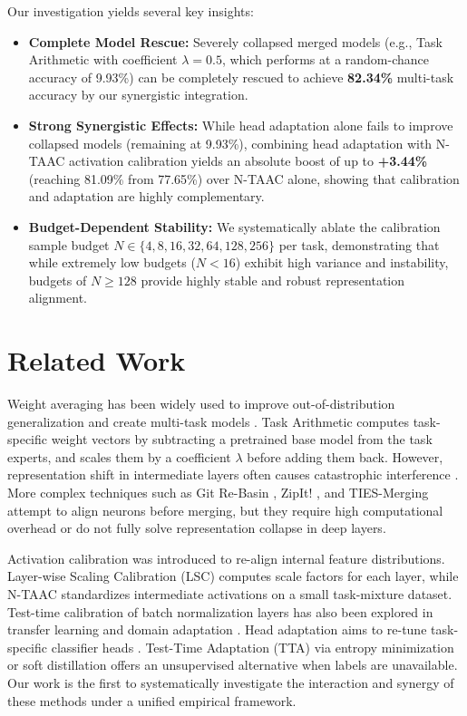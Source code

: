 \documentclass{article}
\theoremstyle{plain}
\theoremstyle{definition}
\theoremstyle{remark}
\begin{document}
Our investigation yields several key insights:
\begin{itemize}
    \item \textbf{Complete Model Rescue:} Severely collapsed merged models (e.g., Task Arithmetic with coefficient $\lambda = 0.5$, which performs at a random-chance accuracy of 9.93\%) can be completely rescued to achieve \textbf{82.34\%} multi-task accuracy by our synergistic integration.
    \item \textbf{Strong Synergistic Effects:} While head adaptation alone fails to improve collapsed models (remaining at 9.93\%), combining head adaptation with N-TAAC activation calibration yields an absolute boost of up to \textbf{+3.44\%} (reaching 81.09\% from 77.65\%) over N-TAAC alone, showing that calibration and adaptation are highly complementary.
    \item \textbf{Budget-Dependent Stability:} We systematically ablate the calibration sample budget $N \in \{4, 8, 16, 32, 64, 128, 256\}$ per task, demonstrating that while extremely low budgets ($N < 16$) exhibit high variance and instability, budgets of $N \ge 128$ provide highly stable and robust representation alignment.
\end{itemize}

\section{Related Work}
\label{sec:related_work}

Weight averaging has been widely used to improve out-of-distribution generalization \cite{cha2022domain, wortsman2022robust} and create multi-task models \cite{wortsman2022model, ilharco2022editing}. Task Arithmetic \cite{ilharco2022editing} computes task-specific weight vectors by subtracting a pretrained base model from the task experts, and scales them by a coefficient $\lambda$ before adding them back. However, representation shift in intermediate layers often causes catastrophic interference \cite{choshen2022fusing, jin2023dataless}. More complex techniques such as Git Re-Basin \cite{ainsworth2022git}, ZipIt! \cite{stoica2023zipit}, and TIES-Merging \cite{yadav2024ties} attempt to align neurons before merging, but they require high computational overhead or do not fully solve representation collapse in deep layers.

Activation calibration was introduced to re-align internal feature distributions. Layer-wise Scaling Calibration (LSC) \cite{choshen2022fusing} computes scale factors for each layer, while N-TAAC \cite{luping2024concrete} standardizes intermediate activations on a small task-mixture dataset. Test-time calibration of batch normalization layers has also been explored in transfer learning and domain adaptation \cite{ioffe2015batch, ba2016layer, ulyanov2016instance, wu2018group, salimans2016weight}. Head adaptation aims to re-tune task-specific classifier heads \cite{liang2020we, hu2021lora, pfeiffer2020adapterhub}. Test-Time Adaptation (TTA) via entropy minimization \cite{wang2021tent} or soft distillation offers an unsupervised alternative when labels are unavailable. Our work is the first to systematically investigate the interaction and synergy of these methods under a unified empirical framework.
\end{document}
